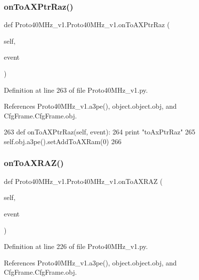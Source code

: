 \subsubsection{\texorpdfstring{on\+To\+A\+X\+Ptr\+Raz()}{onToAXPtrRaz()}}
{\footnotesize\ttfamily def Proto40\+M\+Hz\+\_\+v1.\+Proto40\+M\+Hz\+\_\+v1.\+on\+To\+A\+X\+Ptr\+Raz (\begin{DoxyParamCaption}\item[{}]{self,  }\item[{}]{event }\end{DoxyParamCaption})}



Definition at line 263 of file Proto40\+M\+Hz\+\_\+v1.\+py.



References Proto40\+M\+Hz\+\_\+v1.\+a3pe(), object.\+object.\+obj, and Cfg\+Frame.\+Cfg\+Frame.\+obj.


\begin{DoxyCode}
263     \textcolor{keyword}{def }onToAXPtrRaz(self, event):
264         \textcolor{keywordflow}{print} \textcolor{stringliteral}{"toAxPtrRaz"}
265         self.obj.a3pe().setAddToAXRam(0)
266 
\end{DoxyCode}
\mbox{\label{classProto40MHz__v1_1_1Proto40MHz__v1_a9a9f8eae643623b9aae3239fc204a9d1}} 
\subsubsection{\texorpdfstring{on\+To\+A\+X\+R\+A\+Z()}{onToAXRAZ()}}
{\footnotesize\ttfamily def Proto40\+M\+Hz\+\_\+v1.\+Proto40\+M\+Hz\+\_\+v1.\+on\+To\+A\+X\+R\+AZ (\begin{DoxyParamCaption}\item[{}]{self,  }\item[{}]{event }\end{DoxyParamCaption})}



Definition at line 226 of file Proto40\+M\+Hz\+\_\+v1.\+py.



References Proto40\+M\+Hz\+\_\+v1.\+a3pe(), object.\+object.\+obj, and Cfg\+Frame.\+Cfg\+Frame.\+obj.


